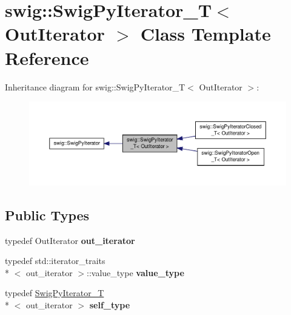 \hypertarget{classswig_1_1_swig_py_iterator___t}{\section{swig\-:\-:Swig\-Py\-Iterator\-\_\-\-T$<$ Out\-Iterator $>$ Class Template Reference}
\label{classswig_1_1_swig_py_iterator___t}
}


Inheritance diagram for swig\-:\-:Swig\-Py\-Iterator\-\_\-\-T$<$ Out\-Iterator $>$\-:\nopagebreak
\begin{figure}[H]
\begin{center}
\leavevmode
\includegraphics[width=350pt]{classswig_1_1_swig_py_iterator___t__inherit__graph}
\end{center}
\end{figure}
\subsection*{Public Types}
\begin{DoxyCompactItemize}
\item 
\hypertarget{classswig_1_1_swig_py_iterator___t_aec35545038c3d804975a147253f061e4}{typedef Out\-Iterator {\bfseries out\-\_\-iterator}}\label{classswig_1_1_swig_py_iterator___t_aec35545038c3d804975a147253f061e4}

\item 
\hypertarget{classswig_1_1_swig_py_iterator___t_a1441e2409c41706ad7aee977165f675e}{typedef std\-::iterator\-\_\-traits\\*
$<$ out\-\_\-iterator $>$\-::value\-\_\-type {\bfseries value\-\_\-type}}\label{classswig_1_1_swig_py_iterator___t_a1441e2409c41706ad7aee977165f675e}

\item 
\hypertarget{classswig_1_1_swig_py_iterator___t_af10eb8078eb41f1dbca3701f27bd8e73}{typedef \hyperlink{classswig_1_1_swig_py_iterator___t}{Swig\-Py\-Iterator\-\_\-\-T}\\*
$<$ out\-\_\-iterator $>$ {\bfseries self\-\_\-type}}\label{classswig_1_1_swig_py_iterator___t_af10eb8078eb41f1dbca3701f27bd8e73}

\end{DoxyCompactItemize}
